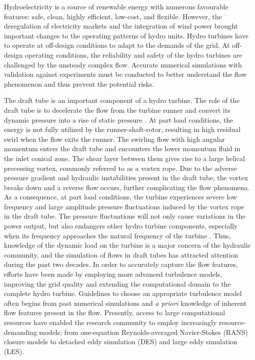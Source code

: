 Hydroelectricity is a source of renewable energy with numerous favourable features: safe, clean, highly efficient, low-cost, and flexible. However, the deregulation of electricity markets and the integration of wind power brought important changes to the operating patterns of hydro units. Hydro turbines have to operate at off-design conditions to adapt to the demands of the grid. At off-design operating conditions, the reliability and safety of the hydro turbines are challenged by the unsteady complex flow. Accurate numerical simulations with validation against experiments must be conducted to better understand the flow phenomenon and thus prevent the potential risks.

The draft tube is an important component of a hydro turbine. The role of the draft tube is to decelerate the flow from the turbine runner and convert its dynamic pressure into a rise of static pressure \cite{sick2002cfd}. At part load conditions, the energy is not fully utilized by the runner-shaft-rotor, resulting in high residual swirl when the flow exits the runner. The swirling flow with high angular momentum enters the draft tube and encounters the lower momentum fluid in the inlet conical zone. The shear layer between them gives rise to a large helical precessing vortex, commonly referred to as a vortex rope. Due to the adverse pressure gradient and hydraulic instabilities present in the draft tube, the vortex breaks down and a reverse flow occurs, further complicating the flow phenomena. As a consequence, at part load conditions, the turbine experiences severe low frequency and large amplitude pressure fluctuations induced by the vortex rope in the draft tube. The pressure fluctuations will not only cause variations in the power output, but also endangers other hydro turbine components, especially when its frequency approaches the natural frequency of the turbine \cite{dorfler2012flow}. Thus, knowledge of the dynamic load on the turbine is a major concern of the hydraulic community, and the simulation of flows in draft tubes has attracted attention during the past two decades.
In order to accurately capture the flow features, efforts have been made by employing more advanced turbulence models, improving the grid quality and extending the computational domain to the complete hydro turbine. Guidelines to choose an appropriate turbulence model often begins from past numerical simulations and {\it a priori} knowledge of inherent flow features present in the flow. Presently, access to large computational resources have enabled the research community to employ increasingly resource-demanding models; from one-equation Reynolds-averaged Navier-Stokes (RANS) closure models to detached eddy simulation (DES) and large eddy simulation (LES).
